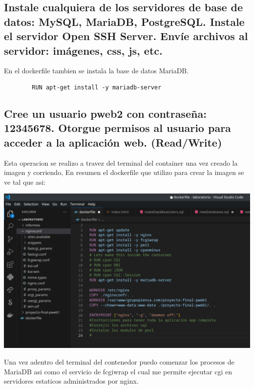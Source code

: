 	\subsection{Instale cualquiera de los servidores de base de datos: MySQL, MariaDB, PostgreSQL.\newline
	Instale el servidor Open SSH Server. Envíe archivos al servidor: imágenes, css, js, etc.\newline}

	En el dockerfile tambien se instala la base de datos MariaDB.

	\begin{lstlisting}
		RUN apt-get install -y mariadb-server
	\end{lstlisting}

	\subsection{Cree un usuario pweb2 con contraseña: 12345678. \newline
	Otorgue permisos al usuario para acceder a la aplicación web. (Read/Write) \newline}

	Esta operacion se realizo a travez del terminal del container una vez creado la imagen y corriendo,
	En resumen el dockerfile que utilizo para crear la imagen se ve tal que asi:

	\includegraphics[scale=0.4]{./img/lab1_1.png}
	
	Una vez adentro del terminal del contenedor puedo comenzar los procesos de MariaDB asi como el servicio de fcgiwrap
	el cual me permite ejecutar cgi en servidores estaticos administrados por nginx.\newline \newline

